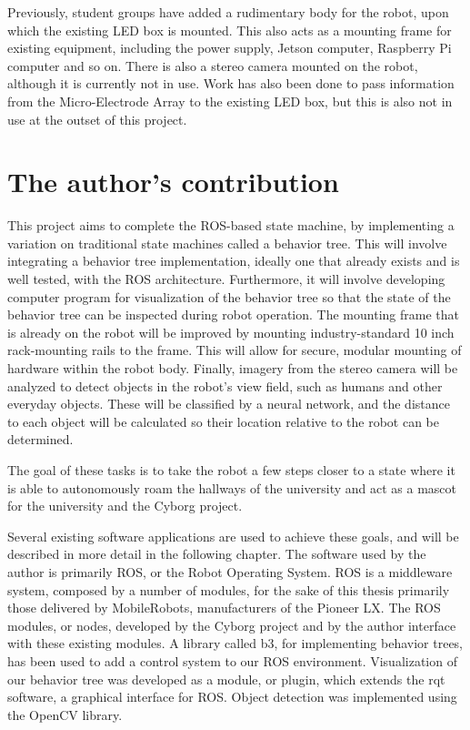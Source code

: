\documentclass[\rootfolder/main.tex]{subfiles}
\begin{document}
Previously, student groups have added a rudimentary body for the robot, upon which the existing LED box is mounted.
This also acts as a mounting frame for existing equipment, including the power supply, Jetson computer, Raspberry Pi computer and so on.
There is also a stereo camera mounted on the robot, although it is currently not in use.
Work has also been done to pass information from the Micro-Electrode Array to the existing LED box, but this is also not in use at the outset of this project.

\section{The author's contribution}

This project aims to complete the ROS-based state machine, by implementing a variation on traditional state machines called a behavior tree.
This will involve integrating a behavior tree implementation, ideally one that already exists and is well tested, with the ROS architecture.
Furthermore, it will involve developing computer program for visualization of the behavior tree so that the state of the behavior tree can be inspected during robot operation.
The mounting frame that is already on the robot will be improved by mounting industry-standard 10 inch rack-mounting rails to the frame.
This will allow for secure, modular mounting of hardware within the robot body.
Finally, imagery from the stereo camera will be analyzed to detect objects in the robot's view field, such as humans and other everyday objects.
These will be classified by a neural network, and the distance to each object will be calculated so their location relative to the robot can be determined.

The goal of these tasks is to take the robot a few steps closer to a state where it is able to autonomously roam the hallways of the university and act as a mascot for the university and the Cyborg project.

Several existing software applications are used to achieve these goals, and will be described in more detail in the following chapter.
The software used by the author is primarily ROS, or the Robot Operating System.
ROS is a middleware system, composed by a number of modules, for the sake of this thesis primarily those delivered by MobileRobots, manufacturers of the Pioneer LX.
The ROS modules, or nodes, developed by the Cyborg project and by the author interface with these existing modules.
A library called b3, for implementing behavior trees, has been used to add a control system to our ROS environment.
Visualization of our behavior tree was developed as a module, or plugin, which extends the rqt software, a graphical interface for ROS.
Object detection was implemented using the OpenCV library.
\end{document}
